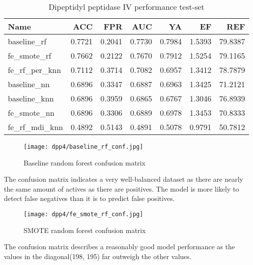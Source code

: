 \begin{table}[H]
    \begin{center}
        \caption{Dipeptidyl peptidase IV performance test-set}
        \begin{tabular}{lrrrrrr}
            \toprule
            Name             & ACC    & FPR    & AUC    & YA     & EF     & REF     \\
            \midrule
            baseline\_rf     & 0.7721 & 0.2041 & 0.7730 & 0.7984 & 1.5393 & 79.8387 \\
            fe\_smote\_rf    & 0.7662 & 0.2122 & 0.7670 & 0.7912 & 1.5254 & 79.1165 \\
            fe\_rf\_per\_knn & 0.7112 & 0.3714 & 0.7082 & 0.6957 & 1.3412 & 78.7879 \\
            baseline\_nn     & 0.6896 & 0.3347 & 0.6887 & 0.6963 & 1.3425 & 71.2121 \\
            baseline\_knn    & 0.6896 & 0.3959 & 0.6865 & 0.6767 & 1.3046 & 76.8939 \\
            fe\_smote\_nn    & 0.6896 & 0.3306 & 0.6889 & 0.6978 & 1.3453 & 70.8333 \\
            fe\_rf\_mdi\_knn & 0.4892 & 0.5143 & 0.4891 & 0.5078 & 0.9791 & 50.7812 \\
            \bottomrule
        \end{tabular}
    \end{center}
\end{table}

\begin{figure}[H]
    \begin{center}
        \caption[]{Baseline random forest confusion matrix}
        \label{fig:dpp4_baseline_rf_conf}
        \texttt{[image: dpp4/baseline\_rf\_conf.jpg]}
    \end{center}
\end{figure}
The confusion matrix indicates a very well-balanced dataset as there are nearly the same amount of actives as there are positives. The model is more likely to detect false negatives than it is to predict false positives.
\begin{figure}[H]
    \begin{center}
        \caption[]{SMOTE random forest confusion matrix}
        \label{fig:dpp4_smote_rf_conf}
        \texttt{[image: dpp4/fe\_smote\_rf\_conf.jpg]}
    \end{center}

\end{figure}
The confusion matrix describes a reasonably good model performance as the values in the diagonal(198, 195) far outweigh the other values.

